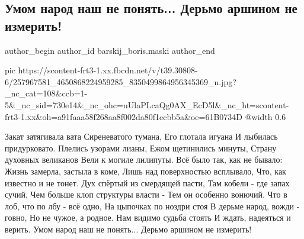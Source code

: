  
 
 
 
 
 
\subsection{Умом народ наш не понять... Дерьмо аршином не измерить!}
\label{sec:17_11_2021.fb.barskij_boris.maski.1.narod_stih}
 
\ifcmt
 author_begin
   author_id barskij_boris.maski
 author_end
\fi

\ifcmt
  pic https://scontent-frt3-1.xx.fbcdn.net/v/t39.30808-6/257967581_4650868224959285_8350499864956345369_n.jpg?_nc_cat=108&ccb=1-5&_nc_sid=730e14&_nc_ohc=uUlaPLcaQg0AX_EcD5l&_nc_ht=scontent-frt3-1.xx&oh=a91faaa58f268aa8f002da80f1ecbb5a&oe=61B0734D
  @width 0.6
\fi

\begin{multicols}{2}
\obeycr
Закат затягивала вата
Сиреневатого тумана, 
Его глотала игуана
И лыбилась придурковато.
\smallskip
Плелись узорами лианы,
Ежом щетинились минуты,
Страну духовных великанов
Вели к могиле лилипуты.
\smallskip
Всё было так, как не бывало:
Жизнь замерла, застыла в коме,
Лишь над поверхностью всплывало,
Что, как известно и не тонет.
\smallskip
Дух спёртый из смердящей пасти,
Там кобели - где запах сучий,
Чем больше клоп структуры власти - 
Тем он особенно вонючий.
\smallskip
Что в лоб, что по лбу - всё одно,
На цыпочках по ноздри стоя
В дерьме народ, вожди - говно,
Но не чужое, а родное.
\smallskip
Нам видимо судьба стоять
И ждать, надеяться и верить.
Умом народ наш не понять...
Дерьмо аршином не измерить!
\restorecr
\end{multicols}

